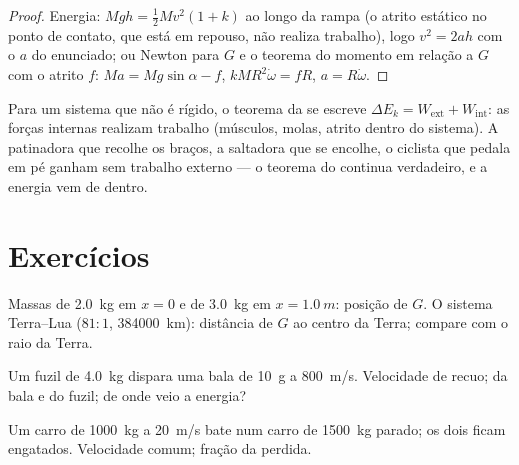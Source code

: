 \begin{proof}
Energia: $Mgh = \tfrac12 Mv^2(1 + k)$ ao longo da rampa (o atrito estático
no ponto de contato, que está em repouso, não realiza trabalho), logo $v^2 = 2ah$ com o $a$
do enunciado; ou Newton para $G$ e o teorema do momento em relação a $G$ com o
atrito $f$: $Ma = Mg\sin\alpha - f$, $kMR^2\dot\omega = fR$, $a = R\dot\omega$.
\end{proof}

\begin{remark}\label{rem:b1:systems-of-points:deformable}
Para um sistema que não é rígido, o teorema da  se escreve
$\Delta E_k = W_{\mathrm{ext}} + W_{\mathrm{int}}$: as forças internas
realizam trabalho (músculos, molas, atrito dentro do sistema). A patinadora
que recolhe os braços, a saltadora que se encolhe, o ciclista que pedala em
pé ganham  sem trabalho externo --- o teorema do  continua verdadeiro, e a energia vem de dentro.
\end{remark}

\section{Exercícios}

\begin{exercise}[$\star$]\label{exo:b1:systems-of-points:1}
Massas de \qty{2.0}{kg} em $x = 0$ e de \qty{3.0}{kg} em $x = \qty{1.0}{m}$:
posição de $G$. O sistema Terra--Lua ($81:1$, \qty{384000}{km}):
distância de $G$ ao centro da Terra; compare com o raio da
Terra.
\end{exercise}

\begin{exercise}[$\star$]\label{exo:b1:systems-of-points:2}
Um fuzil de \qty{4.0}{kg} dispara uma bala de \qty{10}{g} a \qty{800}{m/s}.
Velocidade de recuo;  da bala e do fuzil; de onde veio a
energia?
\end{exercise}

\begin{exercise}[$\star$]\label{exo:b1:systems-of-points:3}
Um carro de \qty{1000}{kg} a \qty{20}{m/s} bate num carro de \qty{1500}{kg} parado;
os dois ficam engatados. Velocidade comum; fração da  perdida.
\end{exercise}

